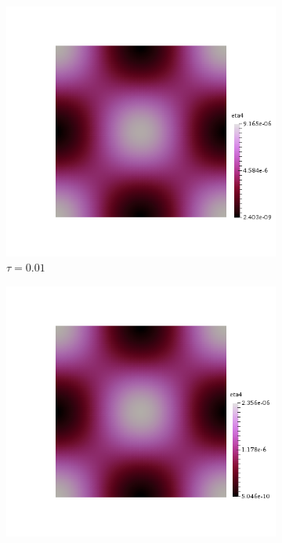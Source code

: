 \begin{figure}[h!]
  \centering
  \begin{subfigure}[b]{0.24\textwidth}
    \includegraphics[width=\textwidth,height=\textheight,keepaspectratio,height=\textheight,keepaspectratio]{figures/2_mpet/default/time/eta4_dt1.png}
    \caption{$\tau=0.01$}
  \end{subfigure}
  \begin{subfigure}[b]{0.24\textwidth}
    \includegraphics[width=\textwidth,height=\textheight,keepaspectratio,height=\textheight,keepaspectratio]{figures/2_mpet/default/time/eta4_dt2.png}

\end{subfigure}
\end{figure}
